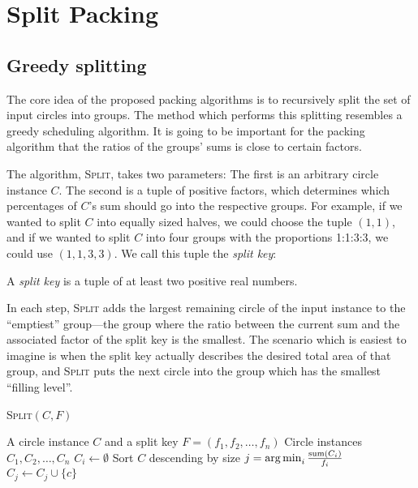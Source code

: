 \chapter{Split Packing}

\section{Greedy splitting}

The core idea of the proposed packing algorithms is to recursively split the set of input circles into groups. The method which performs this splitting resembles a greedy scheduling algorithm. It is going to be important for the packing algorithm that the ratios of the groups' sums is close to certain factors.

The algorithm, \textsc{Split}, takes two parameters: The first is an arbitrary circle instance $C$. The second is a tuple of positive factors, which determines which percentages of $C$'s sum should go into the respective groups. For example, if we wanted to split $C$ into equally sized halves, we could choose the tuple $(1,1)$, and if we wanted to split $C$ into four groups with the proportions 1:1:3:3, we could use $(1,1,3,3)$. We call this tuple the \emph{split key}:

\begin{definition}
    A \emph{split key} is a tuple of at least two positive real numbers.
\end{definition}

In each step, \textsc{Split} adds the largest remaining circle of the input instance to the “emptiest” group---the group where the ratio between the current sum and the associated factor of the split key is the smallest. The scenario which is easiest to imagine is when the split key actually describes the desired total area of that group, and \textsc{Split} puts the next circle into the group which has the smallest “filling level”.

\begin{algorithm}[htbp!]
    \caption{\textsc{Split}$(C,F)$}
    \begin{algorithmic}
        \Require A circle instance $C$ and a split key $F = (f_1, f_2, \dots, f_n)$
        \Ensure Circle instances $C_1, C_2, \dots, C_n$
            \State $C_i \gets \emptyset$
        \EndFor
        \State Sort $C$ descending by size
            \State $j = \operatorname*{arg\,min}_{i} \frac{\operatorname{sum}(C_i)}{f_i}$
            \State $C_j \gets C_j \cup \{c\}$
        \EndFor
    \end{algorithmic}
\end{algorithm}


